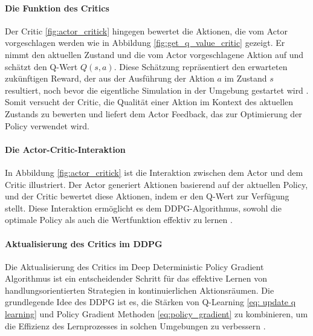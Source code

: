 \paragraph{Die Funktion des Critics}
\label{sec: Rolle des Critics}
Der Critic \ref{fig:actor_critick} hingegen bewertet die Aktionen, die vom Actor vorgeschlagen werden wie in Abbildung \ref{fig:get_q_value_critic} gezeigt. Er nimmt den aktuellen Zustand und die vom Actor vorgeschlagene Aktion auf und schätzt den Q-Wert \( Q(s,a) \). Diese Schätzung repräsentiert den erwarteten zukünftigen Reward, der aus der Ausführung der Aktion \( a \) im Zustand \( s \) resultiert, noch bevor die eigentliche Simulation in der Umgebung gestartet wird \cite{SuttonBarto2018}. Somit versucht der Critic, die Qualität einer Aktion im Kontext des aktuellen Zustands zu bewerten und liefert dem Actor Feedback, das zur Optimierung der Policy verwendet wird.

\paragraph{Die Actor-Critic-Interaktion}
In Abbildung \ref{fig:actor_critick} ist die Interaktion zwischen dem Actor und dem Critic illustriert. Der Actor generiert Aktionen basierend auf der aktuellen Policy, und der Critic bewertet diese Aktionen, indem er den Q-Wert zur Verfügung stellt. Diese Interaktion ermöglicht es dem DDPG-Algorithmus, sowohl die optimale Policy als auch die Wertfunktion effektiv zu lernen \cite{SuttonBarto2018}.


\paragraph{Aktualisierung des Critics im DDPG}

Die Aktualisierung des Critics im Deep Deterministic Policy Gradient Algorithmus ist ein entscheidender Schritt für das effektive Lernen von handlungsorientierten Strategien in kontinuierlichen Aktionsräumen. Die grundlegende Idee des DDPG ist es, die Stärken von Q-Learning \ref{eq: update q learning} und Policy Gradient Methoden \ref{eq:policy_gradient} zu kombinieren, um die Effizienz des Lernprozesses in solchen Umgebungen zu verbessern \cite{Lillicrap2016DDPG}.


